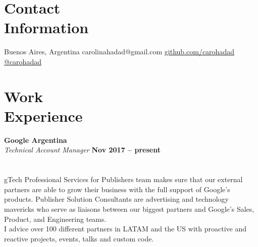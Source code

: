 \documentclass[margin,line]{resume}
\begin{document}
\begin{resume}

\section{\mysidestyle Contact\\Information}

\faMapMarker \vspace{5mm} Buenos Aires, Argentina \hfill
\faEnvelope \vspace{5mm} carolinahadad@gmail.com
\faGithub \vspace{5mm} \href{https://github.com/carohadad}{github.com/carohadad} \hfill
\faTwitter \vspace{5mm} \href{https://twitter.com/carohadad}{@carohadad}

\vspace{-1.5cm}
\section{\mysidestyle Work\\Experience}


\textbf{Google Argentina}\vspace{2mm}\\\vspace{1mm}
\textsl{Technical Account Manager} 
 \hfill \textbf{Nov 2017 -- present}\vspace{-3mm}\\\vspace{-1mm}
\hfill \vspace{-3mm}\\\vspace{-1mm}
\\
gTech Professional Services for Publishers team makes sure that our external partners are able to grow their business with the full support of Google's products. Publisher Solution Consultants are advertising and technology mavericks who serve as liaisons between our biggest partners and Google's Sales, Product, and Engineering teams. 
\\
I advice over 100 different partners in LATAM and the US with proactive and reactive projects, events, talks and custom code.


\end{resume}
\end{document}
